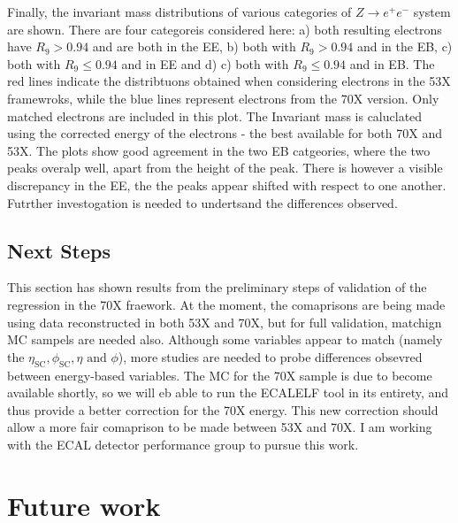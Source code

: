 \documentclass[10pt]{article}
\begin{document}
Finally, the invariant mass distributions of various categories of $Z \rightarrow e^+e^-$ system are shown. There are four categoreis considered here: a) both resulting electrons have $R_9 >0.94$ and are both in the EE, b) both with $R_9>0.94$ and in the EB, c) both with $R_9 \leq 0.94$ and in EE and d) c) both with $R_9 \leq 0.94$ and in EB. The red lines indicate the distribtuons obtained when considering electrons in the 53X framewroks, while the blue lines represent electrons from the 70X version. Only matched electrons are included in this plot. The Invariant mass is caluclated using the corrected energy of the electrons - the best available for both 70X and 53X. The plots show good agreement in the two EB catgeories, where the two peaks overalp well, apart from the height of the peak. There is however a visible discrepancy in the EE, the the peaks appear shifted with respect to one another. Futrther investogation is needed to undertsand the differences observed.

\subsection{Next Steps}

This section has shown results from the preliminary steps of validation of the regression in the 70X fraework. At the moment, the comaprisons are being made using data reconstructed in both 53X and 70X, but for full validation, matchign MC sampels are needed also. Although some variables appear to match (namely the $\eta_{\text{SC}},\phi_{\text{SC}},\eta \text{ and }\phi$), more studies are needed to probe differences obsevred between energy-based variables. The MC for the 70X sample is due to become available shortly, so we will eb able to run the ECALELF tool in its entirety, and thus provide a better correction for the 70X energy. This new correction should allow a more fair comaprison to be made between 53X and 70X. I am working with the ECAL detector performance group to pursue this work.




\section{Future work}
\end{document}
